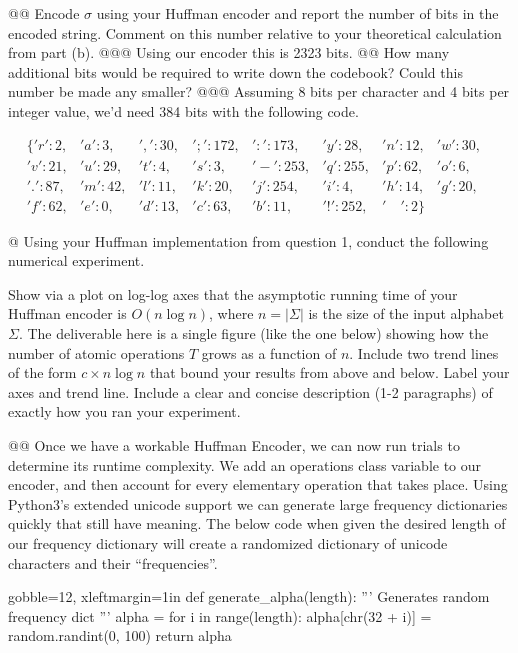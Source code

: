 \documentclass[10pt]{article}
\begin{document}
\begin{easylist}[enumerate]
    @@ Encode $\sigma$ using your Huffman encoder and report the number of bits in the encoded string. Comment on this
    number relative to your theoretical calculation from part (b).
    @@@ Using our encoder this is 2323 bits.
    @@ How many additional bits would be required to write down the codebook? Could this number be made any smaller?
    @@@ Assuming 8 bits per character and 4 bits per integer value, we'd need 384 bits with the following code.

        \[ \begin{aligned}
            \{'r': 2,&    'a': 3,&    ',': 30,&  ';': 172,&  ':': 173,& 'y': 28,&  'n': 12,& 'w': 30,&\\
              'v': 21,&   'u': 29,&   't': 4,&   's': 3,&    '-': 253,& 'q': 255,& 'p': 62,& 'o': 6,&\\
              '.': 87,&   'm': 42,&   'l': 11,&  'k': 20,&   'j': 254,& 'i': 4,&   'h': 14,& 'g': 20,&\\
              'f': 62,&   'e': 0,&    'd': 13,&  'c': 63,&   'b': 11,&  '!': 252,& '\quad': 2\}
        \end{aligned} \]

    @ Using your Huffman implementation from question 1, conduct the following numerical experiment.\newline

    Show via a plot on log-log axes that the asymptotic running time of your Huffman encoder is $O(n \log n)$, where $n
    = |\Sigma|$ is the size of the input alphabet $\Sigma$. The deliverable here is a single figure (like the one below)
    showing how the number of atomic operations $T$ grows as a function of $n$. Include two trend lines of the form $c
    \times n \log n$ that bound your results from above and below. Label your axes and trend line. Include a clear and
    concise description (1-2 paragraphs) of exactly how you ran your experiment.

    @@ Once we have a workable Huffman Encoder, we can now run trials to determine its runtime complexity. We add an
    {\ttfamily operations} class variable to our encoder, and then account for every elementary operation that takes
    place. Using Python3's extended unicode support we can generate large frequency dictionaries quickly that still have
    meaning. The below code when given the desired length of our frequency dictionary will create a randomized
    dictionary of unicode characters and their ``frequencies''.

        \begin{pythoncode*}{gobble=12, xleftmargin=1in}
            def generate_alpha(length):
                ''' Generates random frequency dict '''
                alpha = {}
                for i in range(length):
                    alpha[chr(32 + i)] = random.randint(0, 100)
                return alpha
        \end{pythoncode*}


\end{easylist}
\end{document}

